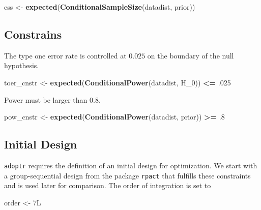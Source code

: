 \documentclass[]{book}
\newenvironment{Shaded}{\begin{snugshade}}{\end{snugshade}}
\newcommand{\DecValTok}[1]{\textcolor[rgb]{0.00,0.00,0.81}{#1}}
\newcommand{\FloatTok}[1]{\textcolor[rgb]{0.00,0.00,0.81}{#1}}
\newcommand{\KeywordTok}[1]{\textcolor[rgb]{0.13,0.29,0.53}{\textbf{#1}}}
\newcommand{\NormalTok}[1]{#1}
\newcommand{\OperatorTok}[1]{\textcolor[rgb]{0.81,0.36,0.00}{\textbf{#1}}}
\newcommand{\StringTok}[1]{\textcolor[rgb]{0.31,0.60,0.02}{#1}}
\begin{document}
\begin{Shaded}
\begin{Highlighting}[]
\NormalTok{ess <-}\StringTok{ }\KeywordTok{expected}\NormalTok{(}\KeywordTok{ConditionalSampleSize}\NormalTok{(datadist, prior))}
\end{Highlighting}
\end{Shaded}

\hypertarget{constrains}{%
\subsection{Constrains}\label{constrains}}

The type one error rate is controlled at \(0.025\) on the boundary of the
null hypothesis.

\begin{Shaded}
\begin{Highlighting}[]
\NormalTok{toer_cnstr <-}\StringTok{ }\KeywordTok{expected}\NormalTok{(}\KeywordTok{ConditionalPower}\NormalTok{(datadist, H_}\DecValTok{0}\NormalTok{)) }\OperatorTok{<=}\StringTok{ }\FloatTok{.025}
\end{Highlighting}
\end{Shaded}

Power must be larger than \(0.8\).

\begin{Shaded}
\begin{Highlighting}[]
\NormalTok{pow_cnstr <-}\StringTok{ }\KeywordTok{expected}\NormalTok{(}\KeywordTok{ConditionalPower}\NormalTok{(datadist, prior)) }\OperatorTok{>=}\StringTok{ }\FloatTok{.8}
\end{Highlighting}
\end{Shaded}

\hypertarget{initial-design}{%
\subsection{Initial Design}\label{initial-design}}

\texttt{adoptr} requires the definition of an initial design for optimization.
We start with a group-sequential design from the package \texttt{rpact} that
fulfills these constraints and is used later for comparison.
The order of integration is set to

\begin{Shaded}
\begin{Highlighting}[]
\NormalTok{order <-}\StringTok{ }\NormalTok{7L}
\end{Highlighting}
\end{Shaded}
\end{document}
